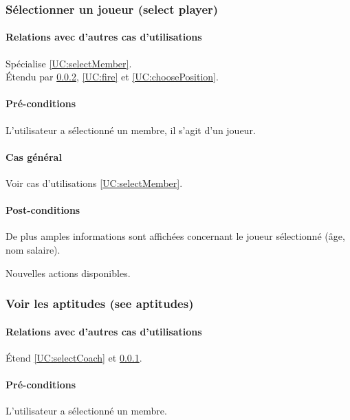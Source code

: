 \subsubsection{Sélectionner un joueur (select player)}
\label{UC:selectPlayer}
\paragraph{Relations avec d'autres cas d'utilisations}
Spécialise \ref{UC:selectMember}.\\
Étendu par \ref{UC:seeAptitudes}, \ref{UC:fire} et \ref{UC:choosePosition}. 
\paragraph{Pré-conditions}
\begin{list}{}{\leftmargin=1.5em}
\item{L'utilisateur a sélectionné un membre, il s'agit d'un joueur.}
\end{list}
\paragraph{Cas général}
Voir cas d'utilisations \ref{UC:selectMember}.
\paragraph{Post-conditions}
\begin{list}{}{\leftmargin=1.5em}
\item{De plus amples informations sont affichées concernant le joueur sélectionné (âge, nom salaire).}
\item{Nouvelles actions disponibles.}
\end{list}

\subsubsection{Voir les aptitudes (see aptitudes)}
\label{UC:seeAptitudes}
\paragraph{Relations avec d'autres cas d'utilisations}
Étend \ref{UC:selectCoach} et \ref{UC:selectPlayer}.
\paragraph{Pré-conditions}
\begin{list}{}{\leftmargin=1.5em}
\item{L'utilisateur a sélectionné un membre.}
\end{list}
